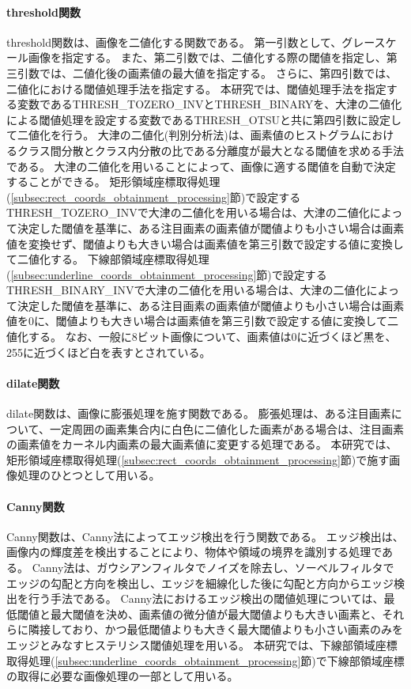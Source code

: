 \paragraph{threshold関数}
threshold関数は、画像を二値化する関数である。
第一引数として、グレースケール画像を指定する。
また、第二引数では、二値化する際の閾値を指定し、第三引数では、二値化後の画素値の最大値を指定する。
さらに、第四引数では、二値化における閾値処理手法を指定する。
本研究では、閾値処理手法を指定する変数であるTHRESH\_TOZERO\_INVとTHRESH\_BINARYを、大津の二値化による閾値処理を設定する変数であるTHRESH\_OTSUと共に第四引数に設定して二値化を行う。
大津の二値化(判別分析法)は、画素値のヒストグラムにおけるクラス間分散とクラス内分散の比である分離度が最大となる閾値を求める手法である\cite{大津の二値化}。
大津の二値化を用いることによって、画像に適する閾値を自動で決定することができる。
矩形領域座標取得処理(\ref{subsec:rect_coords_obtainment_processing}節)で設定するTHRESH\_TOZERO\_INVで大津の二値化を用いる場合は、大津の二値化によって決定した閾値を基準に、ある注目画素の画素値が閾値よりも小さい場合は画素値を変換せず、閾値よりも大きい場合は画素値を第三引数で設定する値に変換して二値化する。
下線部領域座標取得処理(\ref{subsec:underline_coords_obtainment_processing}節)で設定するTHRESH\_BINARY\_INVで大津の二値化を用いる場合は、大津の二値化によって決定した閾値を基準に、ある注目画素の画素値が閾値よりも小さい場合は画素値を0に、閾値よりも大きい場合は画素値を第三引数で設定する値に変換して二値化する。
なお、一般に8ビット画像について、画素値は0に近づくほど黒を、255に近づくほど白を表すとされている\cite{画素値}。


\paragraph{dilate関数}
dilate関数は、画像に膨張処理を施す関数である。
膨張処理は、ある注目画素について、一定周囲の画素集合内に白色に二値化した画素がある場合は、注目画素の画素値をカーネル内画素の最大画素値に変更する処理である\cite{膨張処理}。
本研究では、矩形領域座標取得処理(\ref{subsec:rect_coords_obtainment_processing}節)で施す画像処理のひとつとして用いる。

\paragraph{Canny関数}
Canny関数は、Canny法によってエッジ検出を行う関数である。
エッジ検出は、画像内の輝度差を検出することにより、物体や領域の境界を識別する処理である\cite{エッジ検出}。
Canny法は、ガウシアンフィルタでノイズを除去し、ソーベルフィルタでエッジの勾配と方向を検出し、エッジを細線化した後に勾配と方向からエッジ検出を行う手法である。
Canny法におけるエッジ検出の閾値処理については、最低閾値と最大閾値を決め、画素値の微分値が最大閾値よりも大きい画素と、それらに隣接しており、かつ最低閾値よりも大きく最大閾値よりも小さい画素のみをエッジとみなすヒステリシス閾値処理を用いる\cite{Canny法}。
本研究では、下線部領域座標取得処理(\ref{subsec:underline_coords_obtainment_processing}節)で下線部領域座標の取得に必要な画像処理の一部として用いる。

